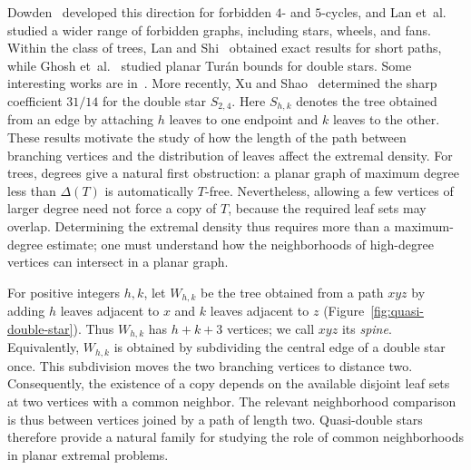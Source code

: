 \documentclass[11pt,a4paper]{article}
\theoremstyle{remark}
\begin{document}
Dowden~\cite{Dowden2016} developed this direction for forbidden $4$- and $5$-cycles, and Lan et~al.~\cite{LanShiSong2019} studied a wider range of forbidden graphs, including stars, wheels, and fans. Within the class of trees, Lan and Shi~\cite{LanShi2019} obtained exact results for short paths, while Ghosh et~al.~\cite{GhoshEtAl2022} studied planar Tur\'an bounds for double stars. Some interesting works are in~\cite{b1,b2,b3,b4,b5}. More recently, Xu and Shao~\cite{XuShao2025} determined the sharp coefficient $31/14$ for the double star $S_{2,4}$. Here $S_{h,k}$ denotes the tree obtained from an edge by attaching $h$ leaves to one endpoint and $k$ leaves to the other. These results motivate the study of how the length of the path between branching vertices and the distribution of leaves affect the extremal density.
For trees, degrees give a natural first obstruction: a planar graph of maximum degree less than $\Delta(T)$ is automatically $T$-free. Nevertheless, allowing a few vertices of larger degree need not force a copy of $T$, because the required leaf sets may overlap. Determining the extremal density thus requires more than a maximum-degree estimate; one must understand how the neighborhoods of high-degree vertices can intersect in a planar graph.

For positive integers $h,k$, let $W_{h,k}$ be the tree obtained from a path $xyz$ by adding $h$ leaves adjacent to $x$ and $k$ leaves adjacent to $z$ (Figure~\ref{fig:quasi-double-star}). Thus $W_{h,k}$ has $h+k+3$ vertices; we call $xyz$ its \emph{spine}. Equivalently, $W_{h,k}$ is obtained by subdividing the central edge of a double star once. This subdivision moves the two branching vertices to distance two. Consequently, the existence of a copy depends on the available disjoint leaf sets at two vertices with a common neighbor. The relevant neighborhood comparison is thus between vertices joined by a path of length two. Quasi-double stars therefore provide a natural family for studying the role of common neighborhoods in planar extremal problems.
\end{document}
